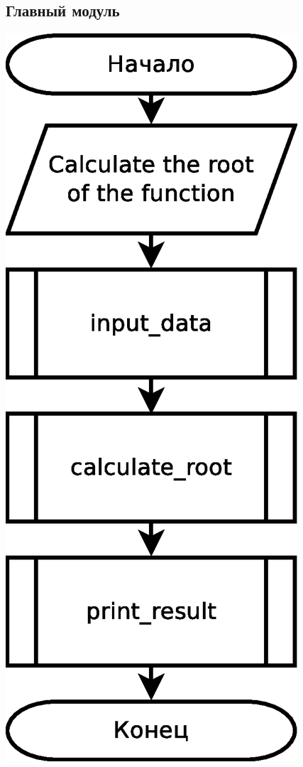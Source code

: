 \documentclass[a4paper]{article}
\begin{document}
\subsection{Главный модуль}
\includegraphics[scale=0.5]{schemes/main}
\end{document}

